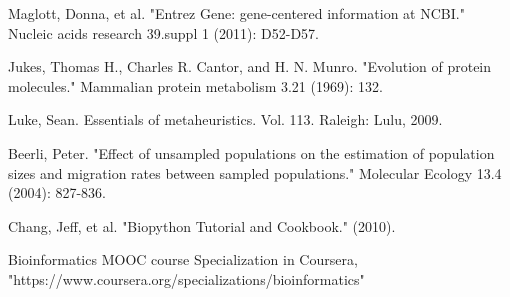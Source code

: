 \documentclass[preprint,12pt]{elsarticle}
\begin{document}
\begin{thebibliography}{1}
\bibitem@
Maglott, Donna, et al. "Entrez Gene: gene-centered information at NCBI." Nucleic acids research 39.suppl 1 (2011): D52-D57.

\bibitem@
Jukes, Thomas H., Charles R. Cantor, and H. N. Munro. "Evolution of protein molecules." Mammalian protein metabolism 3.21 (1969): 132.

\bibitem@
Luke, Sean. Essentials of metaheuristics. Vol. 113. Raleigh: Lulu, 2009.

\bibitem@
Beerli, Peter. "Effect of unsampled populations on the estimation of population sizes and migration rates between sampled populations." Molecular Ecology 13.4 (2004): 827-836.

\bibitem@
Chang, Jeff, et al. "Biopython Tutorial and Cookbook." (2010).

\bibitem@
Bioinformatics MOOC course Specialization in Coursera, "https://www.coursera.org/specializations/bioinformatics"

\end{thebibliography}
\end{document}
